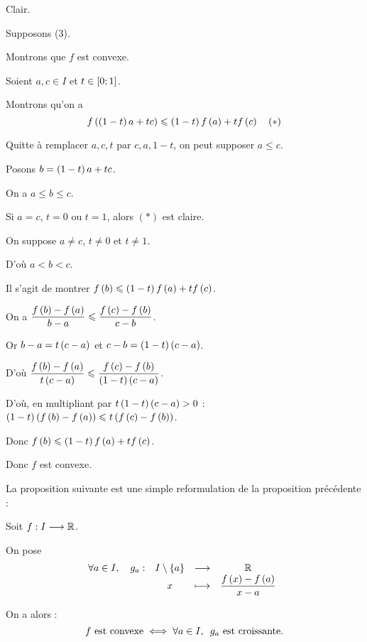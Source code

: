 \begin{dem}[(2) \(\imp\) (3)]
Clair.
\end{dem}

\begin{dem}[(3) \(\imp\) (1)]
Supposons (3).

Montrons que \(f\) est convexe.

Soient \(a,c\in I\) et \(t\in\left[0;1\right]\).

Montrons qu'on a \[f\left(\left(1-t\right)a+tc\right)\leqslant\left(1-t\right)f\left(a\right)+tf\left(c\right)\quad(*)\]

Quitte à remplacer \(a,c,t\) par \(c,a,1-t\), on peut supposer \(a\leq c\).

Posons \(b=\left(1-t\right)a+tc\).

On a \(a\leq b\leq c\).

Si \(a=c\), \(t=0\) ou \(t=1\), alors \((*)\) est claire.

On suppose \(a\not=c\), \(t\not=0\) et \(t\not=1\).

D'où \(a<b<c\).

Il s'agit de montrer \(f\left(b\right)\leqslant\left(1-t\right)f\left(a\right)+tf\left(c\right)\).

On a \(\dfrac{f\left(b\right)-f\left(a\right)}{b-a}\leqslant\dfrac{f\left(c\right)-f\left(b\right)}{c-b}\).

Or \(b-a=t\left(c-a\right)\) et \(c-b=\left(1-t\right)\left(c-a\right)\).

D'où \(\dfrac{f\left(b\right)-f\left(a\right)}{t\left(c-a\right)}\leqslant\dfrac{f\left(c\right)-f\left(b\right)}{\left(1-t\right)\left(c-a\right)}\).

D'où, en multipliant par \(t\left(1-t\right)\left(c-a\right)>0\) : \(\left(1-t\right)\left(f\left(b\right)-f\left(a\right)\right)\leqslant t\left(f\left(c\right)-f\left(b\right)\right)\).

Donc \(f\left(b\right)\leqslant\left(1-t\right)f\left(a\right)+tf\left(c\right)\).

Donc \(f\) est convexe.
\end{dem}

La proposition suivante est une simple reformulation de la proposition précédente :

\begin{prop}
Soit \(f:I\longrightarrow\mathbb{R}\).

On pose \[\quantifs{\forall a\in I}\fonction{g_a}{I\excluant\accol{a}}{\R}{x}{\dfrac{f\paren{x}-f\paren{a}}{x-a}}\]

On a alors : \[f\text{ est convexe}\ssi\quantifs{\forall a\in I}g_a\text{ est croissante}.\]
\end{prop}

